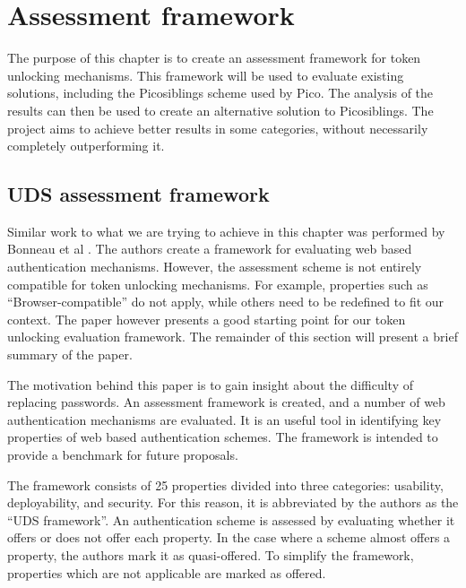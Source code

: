 
\chapter{Assessment framework}

\label{Chapter5}


The purpose of this chapter is to create an assessment framework for token unlocking mechanisms. This framework will be used to evaluate existing solutions, including the Picosiblings scheme used by Pico. The analysis of the results can then be used to create an alternative solution to Picosiblings. The project aims to achieve better results in some categories, without necessarily completely outperforming it.


\section{UDS assessment framework}

Similar work to what we are trying to achieve in this chapter was performed by Bonneau et al \cite{bonneau2012quest}. The authors create a framework for evaluating web based authentication mechanisms. However, the assessment scheme is not entirely compatible for token unlocking mechanisms. For example, properties such as ``Browser-compatible'' do not apply, while others need to be redefined to fit our context.  The paper however presents a good starting point for our token unlocking evaluation framework. The remainder of this section will present a brief summary of the paper.

The motivation behind this paper is to gain insight about the difficulty of replacing passwords. An assessment framework is created, and a number of web authentication mechanisms are evaluated. It is an useful tool in identifying key properties of web based authentication schemes. The framework is intended to provide a benchmark for future proposals.

The framework consists of 25 properties divided into three categories: usability, deployability, and security. For this reason, it is abbreviated by the authors as the ``UDS framework''. An authentication scheme is assessed by evaluating whether it offers or does not offer each property. In the case where a scheme almost offers a property, the authors mark it as quasi-offered. To simplify the framework, properties which are not applicable are marked as offered.

